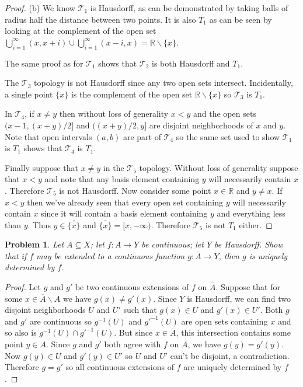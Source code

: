 \documentclass{article}
\newtheorem{problem}{Problem}
\begin{document}
\begin{proof}
(b) We know $\mathcal{T}_1$ is Hausdorff, as can be demonstrated by taking balls of radius half the distance between two points. It is also $T_1$ as can be seen by looking at the complement of the open set $\bigcup_{i=1}^{\infty} (x, x+i) \cup \bigcup_{i=1}^{\infty} (x-i, x) = \mathbb{R} \backslash \{x\}$.

The same proof as for $\mathcal{T}_1$ shows that $\mathcal{T}_2$ is both Hausdorff and $T_1$.

The $\mathcal{T}_3$ topology is not Hausdorff since any two open sets intersect. Incidentally, a single point $\{x\}$ is the complement of the open set $\mathbb{R} \backslash \{x\}$ so $\mathcal{T}_3$ is $T_1$.

In $\mathcal{T}_4$, if $x \neq y$ then without loss of generality $x < y$ and the open sets $(x-1, (x+y)/2]$ and $((x+y)/2, y]$ are disjoint neighborhoods of $x$ and $y$. Note that open intervals $(a,b)$ are part of $\mathcal{T}_4$ so the same set used to show $\mathcal{T}_1$ is $T_1$ shows that $\mathcal{T}_4$ is $T_1$.

Finally suppose that $x \neq y$ in the $\mathcal{T}_5$ topology. Without loss of generality suppose that $x < y$ and note that any basis element containing $y$ will necessarily contain $x$. Therefore $\mathcal{T}_5$ is not Hausdorff. Now consider some point $x \in \mathbb{R}$ and $y \neq x$. If $x < y$ then we've already seen that every open set containing $y$ will necessarily contain $x$ since it will contain a basis element containing $y$ and everything less than $y$. Thus $y \in \overline{\{x\}}$ and $\overline{\{x\}} = [x, -\infty)$. Therefore $\mathcal{T}_5$ is not $T_1$ either.
\end{proof}

\begin{problem}
Let $A \subseteq X$; let $f : A \to Y$ be continuous; let $Y$ be Hausdorff. Show that if $f$ may be extended to a continuous function $g : \overline{A} \to Y$, then $g$ is uniquely determined by $f$.
\end{problem}
\begin{proof}
Let $g$ and $g'$ be two continuous extensions of $f$ on $\overline{A}$. Suppose that for some $x \in \overline{A} \backslash A$ we have $g(x) \neq g'(x)$. Since $Y$ is Hausdorff, we can find two disjoint neighborhoods $U$ and $U'$ such that $g(x) \in U$ and $g'(x) \in U'$. Both $g$ and $g'$ are continuous so $g^{-1}(U)$ and $g'^{-1}(U)$ are open sets containing $x$ and so also is $g^{-1}(U) \cap g'^{-1}(U)$. But since $x \in \overline{A}$, this intersection contains some point $y \in A$. Since $g$ and $g'$ both agree with $f$ on $A$, we have $g(y) = g'(y)$. Now $g(y) \in U$ and $g'(y) \in U'$ so $U$ and $U'$ can't be disjoint, a contradiction. Therefore $g = g'$ so all continuous extensions of $f$ are uniquely determined by $f$.
\end{proof}
\end{document}
